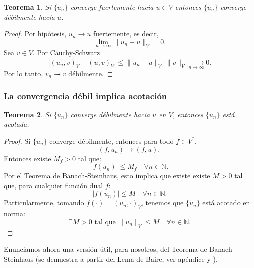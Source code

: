 \documentclass[12pt]{book}
\newtheorem{theorem}{Teorema}
\theoremstyle{definition}
\theoremstyle{plain}
\theoremstyle{remark}
\begin{document}
\begin{theorem}
Si $\{u_n\}$ converge fuertemente hacia $u \in V$ %
entonces $\{u_n\}$ converge débilmente hacia $u$.
\end{theorem}

\begin{proof}
Por hipótesis, $u_n \to u$ fuertemente, es decir, $$\lim_{n \to \infty} \|u_n - u\|_V = 0.$$ Sea $v \in V$. Por Cauchy-Schwarz
\[
|(u_n,v)_V - (u,v)_V| 
\leq \|u_n - u\|_V \cdot \|v \|_V \xrightarrow[n \to \infty]{} 0.
\]
Por lo tanto, %
$v_n \rightharpoonup v$ débilmente.
\end{proof}

\subsubsection{La convergencia débil implica acotación}

\begin{theorem}
Si $\{u_n\}$ converge débilmente hacia $u$ en $V$, entonces $\{u_n\}$ está acotada.
\end{theorem}

\begin{proof}
Si $\{u_n\}$ converge débilmente, entonces %
para todo $f \in V^*$, 
\[
(f,u_n) \rightarrow (f,u).
\
\]
Entonces existe $M_f > 0$ tal que:
\[
|f(u_n)| \leq M_f \quad \forall n \in \mathbb{N}.
\]
Por el {Teorema de Banach-Steinhaus}, esto implica que 
existe
existe $M > 0$ tal que, para cualquier función dual $f$:
\[
|f(u_n)| \leq M \quad \forall n \in \mathbb{N}.
\]
Particularmente, tomando $f(\cdot) = (u_n,\cdot)_V$,
tenemos que
$\{u_n\}$ está acotado en norma:
\[
\exists M > 0 \text{ tal que } \|u_n\|_V \leq M \quad \forall n \in \mathbb{N}.
\]
\end{proof}

\medskip

Enunciamos ahora una versión útil, para nosotros, del Teorema de Banach-Steinhaus (se demuestra a partir del Lema de Baire, ver apéndice y \cite{brezis2011}).
\end{document}
